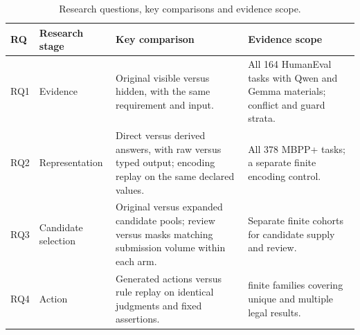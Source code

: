 \begin{table}[t]
\centering\small
\caption{Research questions, key comparisons and evidence scope.}
\label{tab:settings}
\begin{tabularx}{\columnwidth}{@{}ll>{\raggedright\arraybackslash}X>{\raggedright\arraybackslash}X@{}}
\toprule
RQ & Research stage & Key comparison & Evidence scope \\
\midrule
RQ1 & Evidence & Original visible versus hidden, with the same requirement and input. & All 164 HumanEval tasks with Qwen and Gemma materials; conflict and guard strata. \\
\addlinespace
RQ2 & Representation & Direct versus derived answers, with raw versus typed output; encoding replay on the same declared values. & All 378 MBPP+ tasks; a separate finite encoding control. \\
\addlinespace
RQ3 & Candidate selection & Original versus expanded candidate pools; review versus masks matching submission volume within each arm. & Separate finite cohorts for candidate supply and review. \\
\addlinespace
RQ4 & Action & Generated actions versus rule replay on identical judgments and fixed assertions. & 12 finite families covering unique and multiple legal results. \\
\bottomrule
\end{tabularx}
\end{table}
